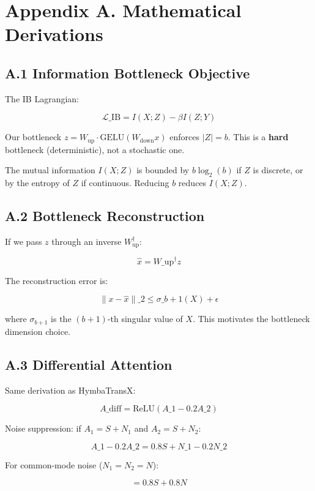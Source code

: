 \section{Appendix A. Mathematical Derivations}

\subsection{A.1 Information Bottleneck Objective}

The IB Lagrangian:

\[
\mathcal{L}\_\text{IB} = I(X; Z) - \beta I(Z; Y)
\tag{A.1}
\]

Our bottleneck $z = W_\text{up} \cdot \text{GELU}(W_\text{down} x)$ 
enforces $|Z| = b$. This is a \textbf{hard} bottleneck (deterministic), not a 
stochastic one.

The mutual information $I(X; Z)$ is bounded by $b \log_2(b)$ if $Z$ is 
discrete, or by the entropy of $Z$ if continuous. Reducing $b$ reduces 
$I(X; Z)$.

\subsection{A.2 Bottleneck Reconstruction}

If we pass $z$ through an inverse $W_\text{up}^\dagger$:

\[
\hat{x} = W\_\text{up}^\dagger z
\tag{A.2}
\]

The reconstruction error is:

\[
\|x - \hat{x}\|\_2 \leq \sigma\_{b+1}(X) + \epsilon
\tag{A.3}
\]

where $\sigma_{b+1}$ is the $(b+1)$-th singular value of $X$. This 
motivates the bottleneck dimension choice.

\subsection{A.3 Differential Attention}

Same derivation as HymbaTransX:

\[
A\_\text{diff} = \text{ReLU}(A\_1 - 0.2 A\_2)
\tag{A.4}
\]

Noise suppression: if $A_1 = S + N_1$ and $A_2 = S + N_2$:

\[
A\_1 - 0.2 A\_2 = 0.8 S + N\_1 - 0.2 N\_2
\tag{A.5}
\]

For common-mode noise ($N_1 = N_2 = N$):

\[
= 0.8 S + 0.8 N
\tag{A.6}
\]

